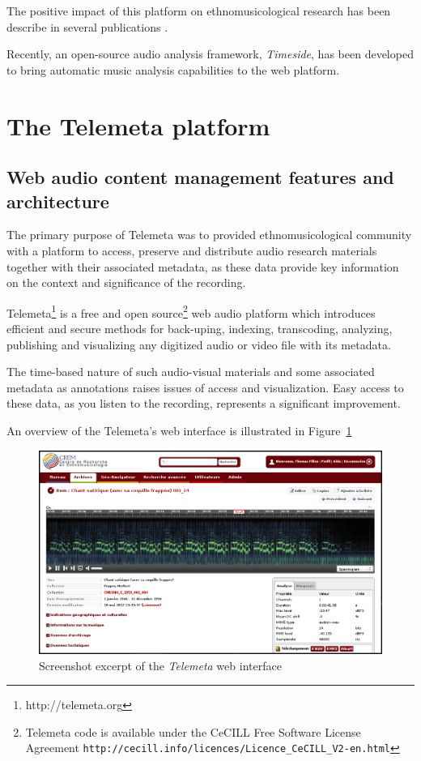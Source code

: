 \documentclass{paper}
\begin{document}
The positive impact of this platform on ethnomusicological research has been describe in several publications \cite{Simmonot_IASA_2011, Julien_IASA_2011, Simonnot_ICTM_2014}.

Recently, an open-source audio analysis framework, \emph{Timeside}, has been developed to bring automatic music analysis capabilities to the web platform.

 \section{The Telemeta platform}\label{sec:Telemeta}
 \subsection{Web audio content management features and architecture}
The primary purpose of Telemeta was to provided ethnomusicological community with a platform to access, preserve and distribute audio research materials together with their associated metadata, as these data provide key information on the context and significance of the recording.

 Telemeta\footnote{http://telemeta.org} is a free and open source\footnote{Telemeta code is available under the CeCILL Free Software License Agreement \texttt{http://cecill.info/licences/Licence\_CeCILL\_V2-en.html}} web audio platform which introduces efficient and secure methods for back-uping, indexing, transcoding, analyzing, publishing and visualizing any digitized audio or video file with its metadata.

The time-based nature of such audio-visual materials and some associated metadata as annotations raises issues of access and visualization. Easy access to these data, as you listen to the recording, represents a significant improvement.

 An overview of the Telemeta's web interface is illustrated in Figure~\ref{fig:Telemeta}
 \begin{figure}
   \centering
   \includegraphics[width=0.95\linewidth]{img/telemeta.png}
   \caption[1]{Screenshot excerpt of the \emph{Telemeta} web interface}
    \label{fig:Telemeta}
 \end{figure}
\end{document}
